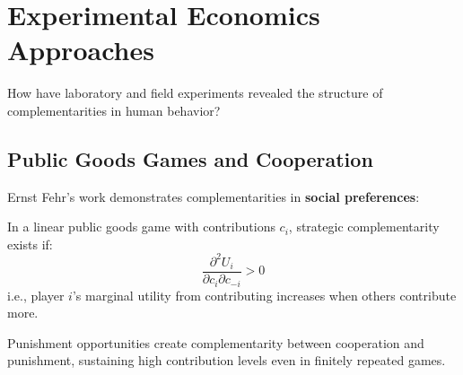 \section{Experimental Economics Approaches}
\label{sec:experimental-economics}

\begin{tcolorbox}[colback=red!5!white,colframe=red!75!black,title=\textbf{Fundamental Question}]
How have laboratory and field experiments revealed the structure of complementarities in human behavior?
\end{tcolorbox}

\subsection{Public Goods Games and Cooperation}
\label{subsec:public-goods}

Ernst Fehr's work demonstrates complementarities in \textbf{social preferences}:

\begin{definition}
In a linear public goods game with contributions $c_i$, strategic complementarity exists if:
\begin{equation}
\frac{\partial^2 U_i}{\partial c_i \partial c_{-i}} > 0
\end{equation}
i.e., player $i$'s marginal utility from contributing increases when others contribute more.
\end{definition}

\begin{finding}
Punishment opportunities create complementarity between cooperation and punishment, sustaining high contribution levels even in finitely repeated games.
\end{finding}

